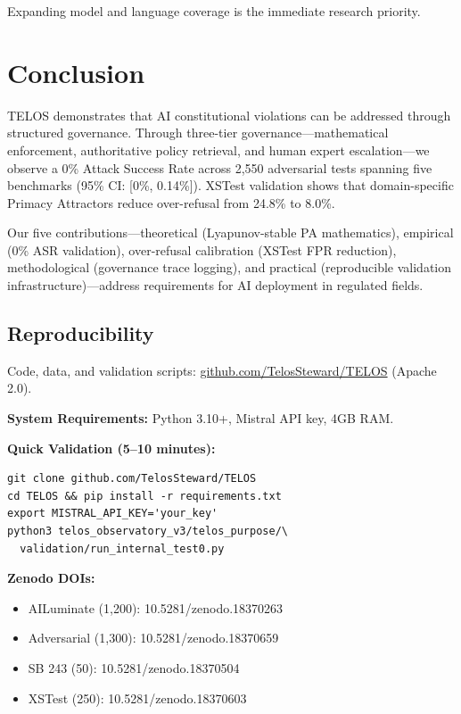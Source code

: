 \documentclass[11pt,twocolumn]{article}
\begin{document}
Expanding model and language coverage is the immediate research priority.

\section{Conclusion}

TELOS demonstrates that AI constitutional violations can be addressed through structured governance. Through three-tier governance---mathematical enforcement, authoritative policy retrieval, and human expert escalation---we observe a 0\% Attack Success Rate across 2,550 adversarial tests spanning five benchmarks (95\% CI: [0\%, 0.14\%]). XSTest validation shows that domain-specific Primacy Attractors reduce over-refusal from 24.8\% to 8.0\%.

Our five contributions---theoretical (Lyapunov-stable PA mathematics), empirical (0\% ASR validation), over-refusal calibration (XSTest FPR reduction), methodological (governance trace logging), and practical (reproducible validation infrastructure)---address requirements for AI deployment in regulated fields.

\subsection{Reproducibility}

Code, data, and validation scripts: \url{github.com/TelosSteward/TELOS} (Apache 2.0).

\textbf{System Requirements:} Python 3.10+, Mistral API key, 4GB RAM.

\textbf{Quick Validation (5--10 minutes):}
\begin{lstlisting}
git clone github.com/TelosSteward/TELOS
cd TELOS && pip install -r requirements.txt
export MISTRAL_API_KEY='your_key'
python3 telos_observatory_v3/telos_purpose/\
  validation/run_internal_test0.py
\end{lstlisting}

\textbf{Zenodo DOIs:}
\begin{itemize}
    \item AILuminate (1,200): 10.5281/zenodo.18370263
    \item Adversarial (1,300): 10.5281/zenodo.18370659
    \item SB 243 (50): 10.5281/zenodo.18370504
    \item XSTest (250): 10.5281/zenodo.18370603
\end{itemize}
\end{document}
